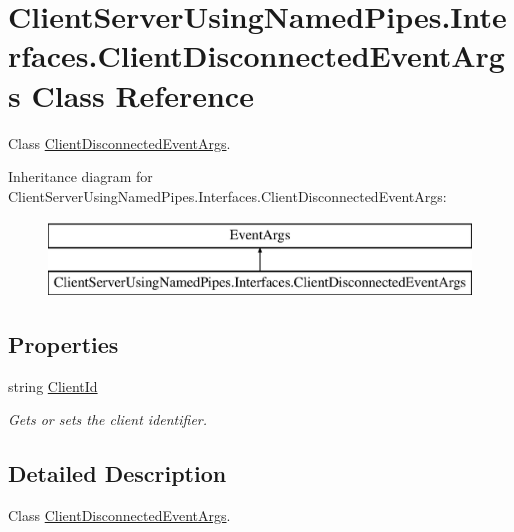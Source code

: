 \hypertarget{class_client_server_using_named_pipes_1_1_interfaces_1_1_client_disconnected_event_args}{}\section{Client\+Server\+Using\+Named\+Pipes.\+Interfaces.\+Client\+Disconnected\+Event\+Args Class Reference}
\label{class_client_server_using_named_pipes_1_1_interfaces_1_1_client_disconnected_event_args}


Class \hyperlink{class_client_server_using_named_pipes_1_1_interfaces_1_1_client_disconnected_event_args}{Client\+Disconnected\+Event\+Args}.  


Inheritance diagram for Client\+Server\+Using\+Named\+Pipes.\+Interfaces.\+Client\+Disconnected\+Event\+Args\+:\begin{figure}[H]
\begin{center}
\leavevmode
\includegraphics[height=2.000000cm]{class_client_server_using_named_pipes_1_1_interfaces_1_1_client_disconnected_event_args}
\end{center}
\end{figure}
\subsection*{Properties}
\begin{DoxyCompactItemize}
\item 
string \hyperlink{class_client_server_using_named_pipes_1_1_interfaces_1_1_client_disconnected_event_args_a7aa5e7a6eab6f1f6f39ece0829c417e7}{Client\+Id}
\begin{DoxyCompactList}\small\item\em Gets or sets the client identifier. \end{DoxyCompactList}\end{DoxyCompactItemize}


\subsection{Detailed Description}
Class \hyperlink{class_client_server_using_named_pipes_1_1_interfaces_1_1_client_disconnected_event_args}{Client\+Disconnected\+Event\+Args}. 

